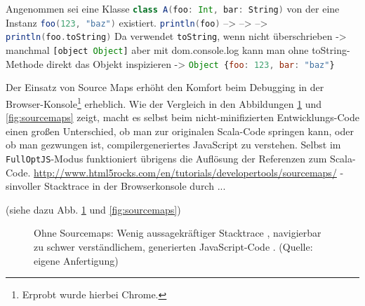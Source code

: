 \documentclass[a4paper, 12pt, hidelinks, listof=totoc, listoftables=totoc, bibliography=totoc]{scrreprt}
\newcommand{\code}[1]{\lstinline[language=Scala, style=inline]|#1|}
\newcommand{\scala}[1]{\lstinline[language=Scala, style=inline]|#1|}
\newcommand{\js}[1]{\lstinline[language=JavaScript, style=inline]|#1|}
\begin{document}
Angenommen sei eine Klasse \scala{class A(foo: Int, bar: String)} von der eine Instanz \scala{foo(123, "baz")} existiert. \scala{println(foo)} --> --> --> \scala{println(foo.toString)}
Da verwendet \scala{toString}, wenn nicht überschrieben -> manchmal \js{[object Object]}
aber mit dom.console.log kann man ohne toString-Methode direkt das Objekt inspizieren -> \js{Object {foo: 123, bar: "baz"}}

Der Einsatz von Source Maps erhöht den Komfort beim Debugging in der Browser-Konsole\footnote{Erprobt wurde hierbei Chrome.} erheblich. Wie der Vergleich in den Abbildungen \ref{fig:no-sourcemaps} und \ref{fig:sourcemaps} zeigt, macht es selbst beim nicht-minifizierten Entwicklungs-Code einen großen Unterschied, ob man zur originalen Scala-Code springen kann, oder ob man gezwungen ist, compilergeneriertes JavaScript zu verstehen. Selbst im \code{FullOptJS}-Modus funktioniert übrigens die Auflösung der Referenzen zum Scala-Code.
\url{http://www.html5rocks.com/en/tutorials/developertools/sourcemaps/}
	- sinvoller Stacktrace in der Browserkonsole durch ...
	
	(siehe dazu Abb. \ref{fig:no-sourcemaps} und \ref{fig:sourcemaps})

\begin{figure}[!h]
	\centering
	\caption{Ohne Sourcemaps: Wenig aussagekräftiger Stacktrace \protect{}, navigierbar zu schwer verständlichem, generierten JavaScript-Code \protect{}. (Quelle: eigene Anfertigung)}
	\label{fig:no-sourcemaps}
\end{figure}
\end{document}
